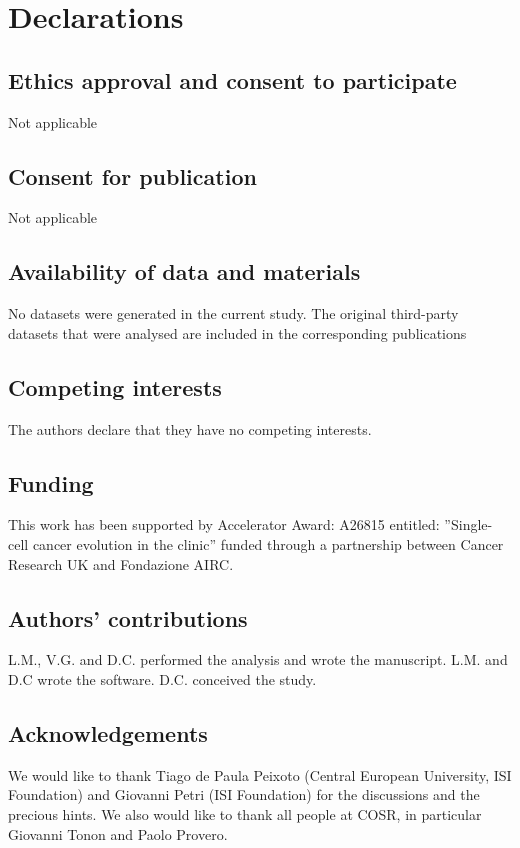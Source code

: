 \documentclass[10pt]{article}
\begin{document}
\section*{Declarations}

\subsection*{Ethics approval and consent to participate}
Not applicable

\subsection*{Consent for publication}
Not applicable

\subsection*{Availability of data and materials}
No datasets were generated in the current study. The original third-party datasets that were analysed are included in the corresponding publications \cite{plass_2018,  mereu_2020, Tian_2019, paul_2015, Zeisel_2015, Bastidas_Ponce_2019, Baron_2016, Aizarani_2019} 

\subsection*{Competing interests}
The authors declare that they have no competing interests.

\subsection*{Funding}
This work has been supported by Accelerator Award: A26815 entitled: ”Single-cell cancer evolution in the clinic” funded through a partnership between Cancer Research UK and Fondazione AIRC.

\subsection*{Authors' contributions}
L.M., V.G. and D.C. performed the analysis and wrote the manuscript. L.M. and D.C wrote the software. D.C. conceived the study.

\subsection*{Acknowledgements}
We would like to thank Tiago de Paula Peixoto (Central European University, ISI Foundation) and Giovanni Petri (ISI Foundation) for the discussions and the precious hints. We also would like to thank all people at COSR, in particular Giovanni Tonon and Paolo Provero.


\end{document}
